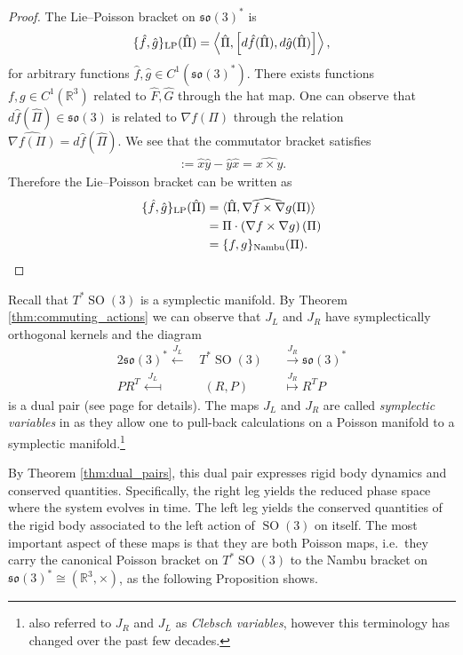 \documentclass[12pt]{amsart}
\newcommand{\so}{\ensuremath{\mathfrak{so}}}
\DeclareMathOperator{\SO}{SO}
\begin{document}
  \begin{proof}
    The Lie--Poisson bracket on $\so(3)^*$ is
    \begin{align*}
      \{ \hat{f} , \hat{g} \}_{\rm LP} (\hat{\Pi}) =
      \left \langle \hat{\Pi} , \left[ d\hat{f}(\hat{\Pi}) , d\hat{g}(\hat{\Pi}) \right]
        \right \rangle,
    \end{align*}
    for arbitrary functions $\hat{f},\hat{g} \in C^1(\so(3)^*)$.
    There exists functions $f,g \in C^1(\mathbb{R}^3)$ related to $\hat{F},\hat{G}$ through the hat map.
    One can observe that $d\hat{f}(\hat{\Pi}) \in \so(3)$ is 
    related to $\nabla f(\Pi)$ through the relation $\widehat{ \nabla f(\Pi)} = d\hat{f}( \hat{\Pi})$.
    We see that the commutator bracket satisfies
    \begin{align*}
      [\hat{x},\hat{y} ] := \hat{x} \hat{y} - \hat{y} \hat{x} = \widehat{x \times y }.
    \end{align*}
    Therefore the Lie--Poisson bracket can be written as
    \begin{align*}
    \{ \hat{f} , \hat{g} \}_{\rm LP}(\hat{\Pi})
    &= \langle \hat{\Pi} , \widehat{ \nabla f \times \nabla g }(\Pi) \rangle \\
    &= \Pi \cdot  \left( \nabla f \times \nabla g \right)(\Pi) \\
    &= \{ f , g \}_{\rm Nambu}(\Pi).
    \end{align*}
  \end{proof}

  Recall that $T^*\SO(3)$ is a symplectic manifold.
  By Theorem \ref{thm:commuting_actions}
  we can observe that $J_L$ and $J_R$ have symplectically
  orthogonal kernels and the diagram
  \begin{alignat*}{2}
    \so(3)^* \stackrel{J_L}{\longleftarrow}&
    \,T^* \SO(3)
    &&\stackrel{J_R}{\longrightarrow} \so(3)^* \\
     PR^T \stackrel{J_L}{\longmapsfrom}&
    \;\; (R,P)
    &&\stackrel{J_R}{\longmapsto} R^TP
  \end{alignat*}
  is a dual pair
  (see page \pageref{thm:dual_pairs} for details).
  The maps $J_L$ and $J_R$ are called \emph{symplectic variables} in \cite{MarsdenWeinstein1983}
  as they allow one to pull-back calculations on a Poisson manifold to a symplectic manifold.\footnote{
  	\cite{MarsdenWeinstein1983} also referred to $J_R$ and $J_L$ as \emph{Clebsch variables},
		however this terminology has changed over the past few decades.}

  By Theorem \ref{thm:dual_pairs}, this dual pair expresses rigid
  body dynamics and conserved quantities.
  Specifically, the right leg yields the reduced phase space where 
  the system evolves in time.
  The left leg yields the conserved quantities of the rigid body
  associated to the left action of $\SO(3)$ on itself.
  The most important aspect of these maps is that they are both Poisson
  maps, i.e.\ they carry the canonical Poisson bracket on $T^* \SO(3)$
  to the Nambu bracket on $\so(3)^* \cong (\mathbb{R}^3,\times)$,
  as the following Proposition shows.
\end{document}
